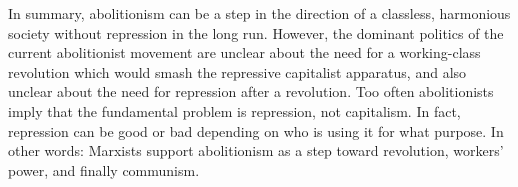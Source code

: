 In summary, abolitionism can be a step in the direction of a classless, harmonious society without repression in the long run. However, the dominant politics of the current abolitionist movement are unclear about the need for a working-class revolution which would smash the repressive capitalist apparatus, and also unclear about the need for repression after a revolution. Too often abolitionists imply that the fundamental problem is repression, not capitalism. In fact, repression can be good or bad depending on who is using it for what purpose. In other words: Marxists support abolitionism as a step toward revolution, workers' power, and finally communism.
